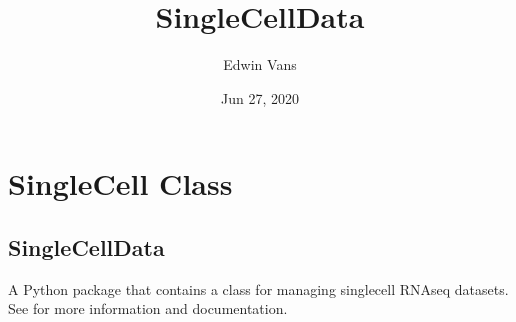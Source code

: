 \documentclass[letterpaper,10pt,english]{sphinxmanual}
\title{SingleCellData}
\date{Jun 27, 2020}
\author{Edwin Vans}
\begin{document}
\pagestyle{empty}
\sphinxmaketitle
\pagestyle{plain}
\sphinxtableofcontents
\pagestyle{normal}
\label{\detokenize{index::doc}}



\chapter{SingleCell Class}
\label{\detokenize{index:module-singlecelldata}}\label{\detokenize{index:singlecell-class}}

\section{SingleCellData}
\label{\detokenize{index:singlecelldata}}
A Python package that contains a class for managing single\sphinxhyphen{}cell RNA\sphinxhyphen{}seq datasets.
See  for more information and documentation.
\end{document}
